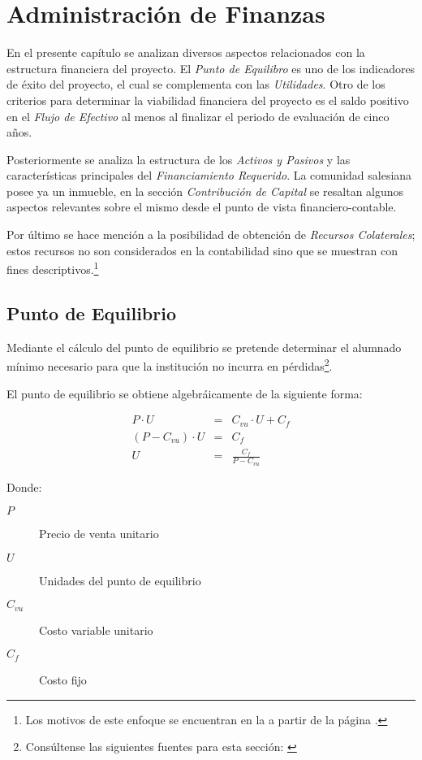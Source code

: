 \chapter{Administración de Finanzas}
\label{cap:Admin:Finanzas}

En el presente capítulo se analizan diversos aspectos relacionados con la estructura financiera del proyecto. El \emph{Punto de Equilibro} es uno de los indicadores de éxito del proyecto, el cual se complementa con las \emph{Utilidades}. Otro de los criterios para determinar la viabilidad financiera del proyecto es el saldo positivo en el \emph{Flujo de Efectivo} al menos al finalizar el periodo de evaluación de cinco años.

Posteriormente se analiza la estructura de los \emph{Activos y Pasivos} y las características principales del \emph{Financiamiento Requerido}. La comunidad salesiana posee ya un inmueble, en la sección \emph{Contribución de Capital} se resaltan algunos aspectos relevantes sobre el mismo desde el punto de vista financiero-contable.

Por último se hace mención a la posibilidad de obtención de \emph{Recursos Colaterales}; estos recursos no son considerados en la contabilidad sino que se muestran con fines descriptivos.\footnote{Los motivos de este enfoque se encuentran en la  a partir de la página \pageref{ch:Introduccion}.}

\section{Punto de Equilibrio}

Mediante el cálculo del punto de equilibrio se pretende determinar el alumnado mínimo necesario para que la institución no incurra en pérdidas\footnote{Consúltense las siguientes fuentes para esta sección: \citep{Van2003fundamentos, novoa2008finanzas, bodie2003finanzas}}.

El punto de equilibrio se obtiene algebráicamente de la siguiente forma:

$$
	\begin{array}{rcl}
		P \cdot U &=& C_{vu} \cdot U + C_f \\
		\left( P - C_{vu} \right) \cdot U &=& C_f \\
		U &=& \frac{C_f}{P - C_{vu}}
	\end{array}
$$

Donde:

\begin{description}
	\item[$P$] Precio de venta unitario
	\item[$U$] Unidades del punto de equilibrio
	\item[$C_{vu}$] Costo variable unitario
	\item[$C_f$] Costo fijo
\end{description}

